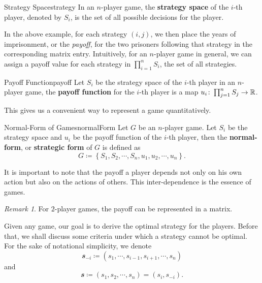 \documentclass[math]{amznotes}
\theoremstyle{remark}
\newtheorem*{remark}{Remark}
\begin{document}
\begin{dfnbox}{Strategy Space}{strategy}
    In an $n$-player game, the {\color{red} \textbf{strategy space}} of the $i$-th player, denoted by $S_i$, is the set of all possible decisions for the player.
\end{dfnbox}
In the above example, for each strategy $\left(i, j\right)$, we then place the years of imprisonment, or the \textit{payoff}, for the two prisoners following that strategy in the corresponding matrix entry. Intuitively, for an $n$-player game in general, we can assign a payoff value for each strategy in $\prod_{i = 1}^nS_i$, the set of all strategies. 
\begin{dfnbox}{Payoff Function}{payoff}
    Let $S_i$ be the strategy space of the $i$-th player in an $n$-player game, the {\color{red} \textbf{payoff function}} for the $i$-th player is a map $u_i \colon \prod_{j = 1}^nS_j \to \mathbb{R}$.
\end{dfnbox}
This gives us a convenient way to represent a game quantitatively.
\begin{dfnbox}{Normal-Form of Games}{normalForm}
    Let $G$ be an $n$-player game. Let $S_i$ be the strategy space and $u_i$ be the payoff function of the $i$-th player, then the {\color{red} \textbf{normal-form}}, or {\color{red} \textbf{strategic form}} of $G$ is defined as 
    \begin{equation*}
        G \coloneqq \left\{S_1, S_2, \cdots, S_n, u_1, u_2, \cdots, u_n\right\}.
    \end{equation*}
\end{dfnbox}
It is important to note that the payoff a player depends not only on his own action but also on the actions of others. This inter-dependence is the
essence of games.
\begin{notebox}
    \begin{remark}
        For $2$-player games, the payoff can be represented in a matrix.
    \end{remark}
\end{notebox}
Given any game, our goal is to derive the optimal strategy for the players. Before that, we shall discuss some criteria under which a strategy cannot be optimal. For the sake of notational simplicity, we denote 
\begin{equation*}
    \mathbfit{s}_{-i} \coloneqq \left(s_1, \cdots, s_{i - 1}, s_{i + 1}, \cdots, s_n\right)
\end{equation*}
and 
\begin{equation*}
    \mathbfit{s} \coloneqq \left(s_1, s_2, \cdots, s_n\right) = \left(s_i, s_{-i}\right).
\end{equation*}
\end{document}
